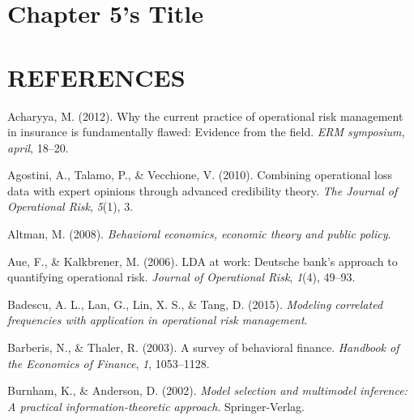 \documentclass{DissertateUSU}
\begin{document}
\FloatBarrier
\newpage
{}
\fancyhead[R]{\thepage}
\fancyfoot[C]{}

\chapter{Chapter 5's Title}

\FloatBarrier
\newpage
{}
\fancyhead[R]{\thepage}
\fancyfoot[C]{}

\chapter*{REFERENCES}

\setlength{\parindent}{-0.5in}
\setlength{\leftskip}{0.4in}
\setlength{\parskip}{6pt}

\noindent

\hypertarget{refs}{}
\leavevmode\hypertarget{ref-acharyya2012current}{}%
Acharyya, M. (2012). Why the current practice of operational risk
management in insurance is fundamentally flawed: Evidence from the
field. \emph{ERM symposium, april}, 18--20.

\leavevmode\hypertarget{ref-agostini2010combining}{}%
Agostini, A., Talamo, P., \& Vecchione, V. (2010). Combining operational
loss data with expert opinions through advanced credibility theory.
\emph{The Journal of Operational Risk}, \emph{5}(1), 3.

\leavevmode\hypertarget{ref-altman2008behavioral}{}%
Altman, M. (2008). \emph{Behavioral economics, economic theory and
public policy}.

\leavevmode\hypertarget{ref-aue2006lda}{}%
Aue, F., \& Kalkbrener, M. (2006). LDA at work: Deutsche bank's approach
to quantifying operational risk. \emph{Journal of Operational Risk},
\emph{1}(4), 49--93.

\leavevmode\hypertarget{ref-badescu2015modeling}{}%
Badescu, A. L., Lan, G., Lin, X. S., \& Tang, D. (2015). \emph{Modeling
correlated frequencies with application in operational risk management}.

\leavevmode\hypertarget{ref-barberis2003survey}{}%
Barberis, N., \& Thaler, R. (2003). A survey of behavioral finance.
\emph{Handbook of the Economics of Finance}, \emph{1}, 1053--1128.

\leavevmode\hypertarget{ref-Burnham2002}{}%
Burnham, K., \& Anderson, D. (2002). \emph{Model selection and
multimodel inference: A practical information-theoretic approach}.
Springer-Verlag.
\end{document}
